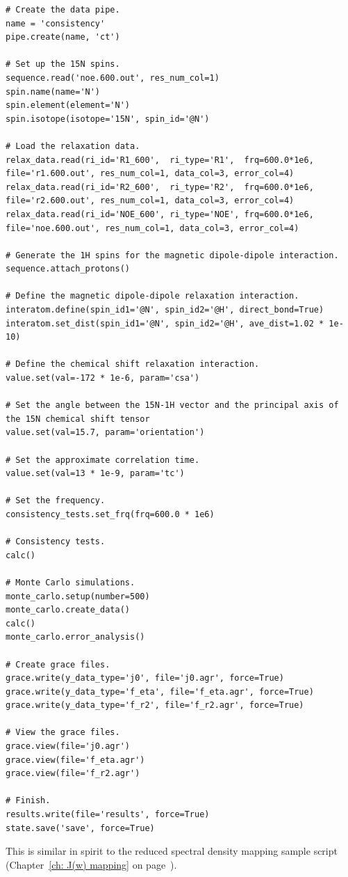 \begin{lstlisting}
# Create the data pipe.
name = 'consistency'
pipe.create(name, 'ct')

# Set up the 15N spins.
sequence.read('noe.600.out', res_num_col=1)
spin.name(name='N')
spin.element(element='N')
spin.isotope(isotope='15N', spin_id='@N')

# Load the relaxation data.
relax_data.read(ri_id='R1_600',  ri_type='R1',  frq=600.0*1e6, file='r1.600.out', res_num_col=1, data_col=3, error_col=4)
relax_data.read(ri_id='R2_600',  ri_type='R2',  frq=600.0*1e6, file='r2.600.out', res_num_col=1, data_col=3, error_col=4)
relax_data.read(ri_id='NOE_600', ri_type='NOE', frq=600.0*1e6, file='noe.600.out', res_num_col=1, data_col=3, error_col=4)

# Generate the 1H spins for the magnetic dipole-dipole interaction.
sequence.attach_protons()

# Define the magnetic dipole-dipole relaxation interaction.
interatom.define(spin_id1='@N', spin_id2='@H', direct_bond=True)
interatom.set_dist(spin_id1='@N', spin_id2='@H', ave_dist=1.02 * 1e-10)

# Define the chemical shift relaxation interaction.
value.set(val=-172 * 1e-6, param='csa')

# Set the angle between the 15N-1H vector and the principal axis of the 15N chemical shift tensor
value.set(val=15.7, param='orientation')

# Set the approximate correlation time.
value.set(val=13 * 1e-9, param='tc')

# Set the frequency.
consistency_tests.set_frq(frq=600.0 * 1e6)

# Consistency tests.
calc()

# Monte Carlo simulations.
monte_carlo.setup(number=500)
monte_carlo.create_data()
calc()
monte_carlo.error_analysis()

# Create grace files.
grace.write(y_data_type='j0', file='j0.agr', force=True)
grace.write(y_data_type='f_eta', file='f_eta.agr', force=True)
grace.write(y_data_type='f_r2', file='f_r2.agr', force=True)

# View the grace files.
grace.view(file='j0.agr')
grace.view(file='f_eta.agr')
grace.view(file='f_r2.agr')

# Finish.
results.write(file='results', force=True)
state.save('save', force=True)
\end{lstlisting}

This is similar in spirit to the reduced spectral density mapping sample script (Chapter~\ref{ch: J(w) mapping} on page~\pageref{ch: J(w) mapping}).


